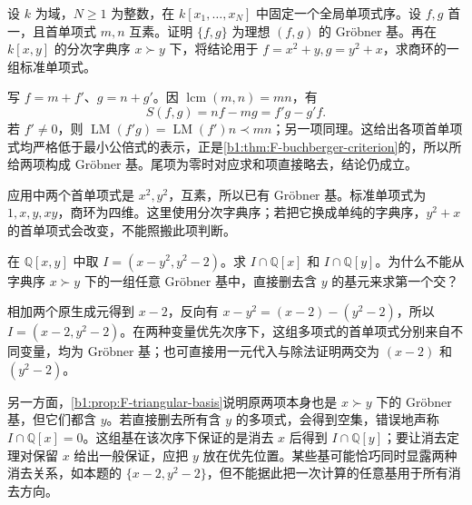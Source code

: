 \begin{exercise}\label{b1:ex:F-coprime-leading}
	设 \(k\) 为域，\(N\ge1\) 为整数，在 \(k[x_1,\ldots,x_N]\) 中固定一个全局单项式序。设 \(f,g\) 首一，且首单项式 \(m,n\) 互素。证明 \(\{f,g\}\) 为理想 \((f,g)\) 的 Gröbner 基。再在 \(k[x,y]\) 的分次字典序 \(x\succ y\) 下，将结论用于 \(f=x^2+y,g=y^2+x\)，求商环的一组标准单项式。
\end{exercise}
\begin{solution}
	写 \(f=m+f'\)、\(g=n+g'\)。因 \(\operatorname{lcm}(m,n)=mn\)，有
	\[
		S(f,g)=nf-mg=f'g-g'f.
	\]
	若 \(f'\ne0\)，则 \(\operatorname{LM}(f'g)=\operatorname{LM}(f')n\prec mn\)；另一项同理。这给出各项首单项式均严格低于最小公倍式的表示，正是\cref{b1:thm:F-buchberger-criterion}的，所以所给两项构成 Gröbner 基。尾项为零时对应求和项直接略去，结论仍成立。

	应用中两个首单项式是 \(x^2,y^2\)，互素，所以已有 Gröbner 基。标准单项式为 \(1,x,y,xy\)，商环为四维。这里使用分次字典序；若把它换成单纯的字典序，\(y^2+x\) 的首单项式会改变，不能照搬此项判断。
\end{solution}

\begin{exercise}\label{b1:ex:F-elimination-order}
	在 \(\mathbb Q[x,y]\) 中取 \(I=(x-y^2,y^2-2)\)。求 \(I\cap\mathbb Q[x]\) 和 \(I\cap\mathbb Q[y]\)。为什么不能从字典序 \(x\succ y\) 下的一组任意 Gröbner 基中，直接删去含 \(y\) 的基元来求第一个交？
\end{exercise}
\begin{solution}
	相加两个原生成元得到 \(x-2\)，反向有 \(x-y^2=(x-2)-(y^2-2)\)，所以 \(I=(x-2,y^2-2)\)。在两种变量优先次序下，这组多项式的首单项式分别来自不同变量，均为 Gröbner 基；也可直接用一元代入与除法证明两交为 \((x-2)\) 和 \((y^2-2)\)。

	另一方面，\cref{b1:prop:F-triangular-basis}说明原两项本身也是 \(x\succ y\) 下的 Gröbner 基，但它们都含 \(y\)。若直接删去所有含 \(y\) 的多项式，会得到空集，错误地声称 \(I\cap\mathbb Q[x]=0\)。这组基在该次序下保证的是消去 \(x\) 后得到 \(I\cap\mathbb Q[y]\)；要让消去定理对保留 \(x\) 给出一般保证，应把 \(y\) 放在优先位置。某些基可能恰巧同时显露两种消去关系，如本题的 \(\{x-2,y^2-2\}\)，但不能据此把一次计算的任意基用于所有消去方向。
\end{solution}

